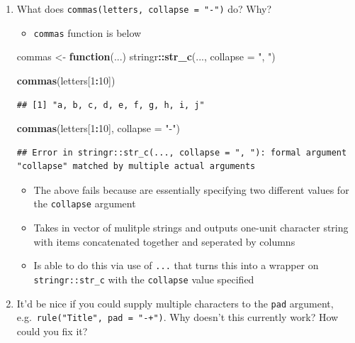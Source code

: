 \documentclass[]{book}
\newenvironment{Shaded}{\begin{snugshade}}{\end{snugshade}}
\newcommand{\ControlFlowTok}[1]{\textcolor[rgb]{0.13,0.29,0.53}{\textbf{#1}}}
\newcommand{\DataTypeTok}[1]{\textcolor[rgb]{0.13,0.29,0.53}{#1}}
\newcommand{\DecValTok}[1]{\textcolor[rgb]{0.00,0.00,0.81}{#1}}
\newcommand{\KeywordTok}[1]{\textcolor[rgb]{0.13,0.29,0.53}{\textbf{#1}}}
\newcommand{\NormalTok}[1]{#1}
\newcommand{\OperatorTok}[1]{\textcolor[rgb]{0.81,0.36,0.00}{\textbf{#1}}}
\newcommand{\StringTok}[1]{\textcolor[rgb]{0.31,0.60,0.02}{#1}}
\providecommand{\tightlist}{%
  \setlength{\itemsep}{0pt}\setlength{\parskip}{0pt}}
\theoremstyle{definition}
\theoremstyle{definition}
\theoremstyle{definition}
\theoremstyle{remark}
\begin{document}
\begin{enumerate}
\def\labelenumi{\arabic{enumi}.}
\item
  What does \texttt{commas(letters,\ collapse\ =\ "-")} do? Why?

  \begin{itemize}
  \tightlist
  \item
    \texttt{commas} function is below
  \end{itemize}

\begin{Shaded}
\begin{Highlighting}[]
\NormalTok{commas <-}\StringTok{ }\ControlFlowTok{function}\NormalTok{(...) stringr}\OperatorTok{::}\KeywordTok{str_c}\NormalTok{(..., }\DataTypeTok{collapse =} \StringTok{", "}\NormalTok{)}

\KeywordTok{commas}\NormalTok{(letters[}\DecValTok{1}\OperatorTok{:}\DecValTok{10}\NormalTok{])}
\end{Highlighting}
\end{Shaded}

\begin{verbatim}
## [1] "a, b, c, d, e, f, g, h, i, j"
\end{verbatim}

\begin{Shaded}
\begin{Highlighting}[]
\KeywordTok{commas}\NormalTok{(letters[}\DecValTok{1}\OperatorTok{:}\DecValTok{10}\NormalTok{], }\DataTypeTok{collapse =} \StringTok{"-"}\NormalTok{)}
\end{Highlighting}
\end{Shaded}

\begin{verbatim}
## Error in stringr::str_c(..., collapse = ", "): formal argument "collapse" matched by multiple actual arguments
\end{verbatim}

  \begin{itemize}
  \item
    The above fails because are essentially specifying two different
    values for the \texttt{collapse} argument
  \item
    Takes in vector of mulitple strings and outputs one-unit character
    string with items concatenated together and seperated by columns
  \item
    Is able to do this via use of \texttt{...} that turns this into a
    wrapper on \texttt{stringr::str\_c} with the \texttt{collapse} value
    specified
  \end{itemize}
\item
  It'd be nice if you could supply multiple characters to the
  \texttt{pad} argument, e.g.~\texttt{rule("Title",\ pad\ =\ "-+")}. Why
  doesn't this currently work? How could you fix it?


\end{enumerate}
\end{document}

